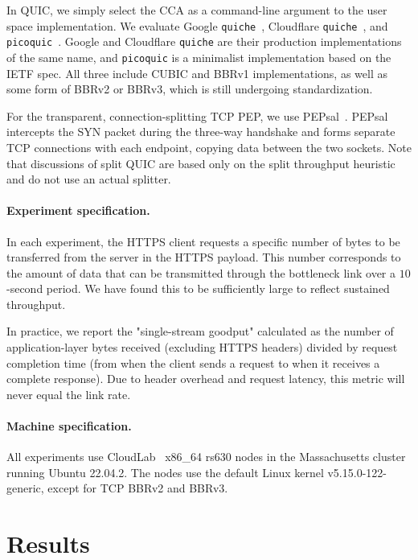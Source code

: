 In QUIC, we simply select the CCA as a command-line
argument to the user space implementation. We evaluate Google \texttt
{quiche}~\cite{google-quiche}, Cloudflare \texttt{quiche}~\cite
{quiche}, and \texttt{picoquic}~\cite{picoquic}. Google and Cloudflare \texttt
{quiche} are their production implementations of the same name,
and \texttt{picoquic} is a minimalist implementation based on the IETF spec.
All three include CUBIC and BBRv1 implementations, as well as some form of
BBRv2 or BBRv3, which is still undergoing standardization.

For the transparent, connection-splitting TCP PEP, we use PEPsal~\cite
{caini2006pepsal}. PEPsal intercepts the SYN packet during the three-way
handshake and forms separate TCP connections with each endpoint,
copying data between the two sockets. Note that
discussions of split QUIC are based only on the split throughput heuristic
and do not use an actual splitter.

\paragraph{Experiment specification.}
In each experiment, the HTTPS client requests a specific number of bytes to be
transferred from the server in the HTTPS payload. This number corresponds to the
amount of data that can be transmitted through the bottleneck link over a
$10$-second period. We have found this to be sufficiently large to reflect
sustained throughput.

In practice, we report the "single-stream goodput" calculated as the number of
application-layer bytes received (excluding HTTPS headers) divided by request
completion time (from when the client sends a request to when it receives a
complete response). Due to header overhead and request latency, this metric
will never equal the link rate.

\paragraph{Machine specification.} All experiments use CloudLab~\cite
 {duplyakin2019design} x86\_64 rs630 nodes in the Massachusetts cluster running
 Ubuntu 22.04.2. The nodes use the default Linux kernel v5.15.0-122-generic,
 except for TCP BBRv2 and BBRv3.%

\section{Results}
\label{sec:splitting:results}

